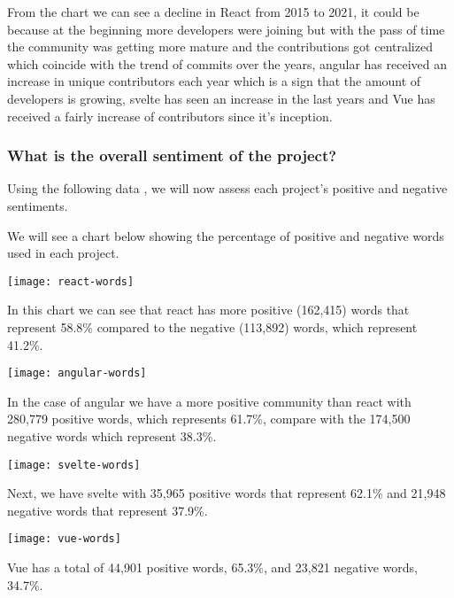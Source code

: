 From the chart we can see a decline in React from 2015 to 2021, it could be because at the beginning more developers were joining but with the pass of time the community was getting more mature and the contributions got centralized which coincide with the trend of commits over the years, angular has received an increase in unique contributors each year which is a sign that the amount of developers is growing, svelte has seen an increase in the last years and Vue has received a fairly increase of contributors since it's inception.

\subsubsection{What is the overall sentiment of the project?}
Using the following data \cite{overall-sentiment}, we will now assess each project's positive and negative sentiments.

We will see a chart below showing the percentage of positive and negative words used in each project.

\begin{center}
    \texttt{[image: react-words]}    
\end{center}

In this chart we can see that react has more positive (162,415) words that represent 58.8\% compared to the negative (113,892) words, which represent 41.2\%.

\begin{center}
    \texttt{[image: angular-words]}    
\end{center}

In the case of angular we have a more positive community than react with 280,779 positive words, which represents 61.7\%, compare with the 174,500 negative words which represent 38.3\%.

\begin{center}
    \texttt{[image: svelte-words]}    
\end{center}

Next, we have svelte with 35,965 positive words that represent 62.1\% and 21,948 negative words that represent 37.9\%.

\begin{center}
    \texttt{[image: vue-words]}    
\end{center}

Vue has a total of 44,901 positive words, 65.3\%, and 23,821 negative words, 34.7\%.

